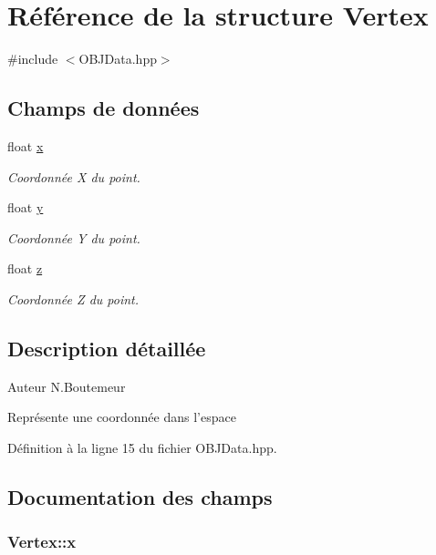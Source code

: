 \hypertarget{structVertex}{\section{Référence de la structure Vertex}
\label{structVertex}
}


{\ttfamily \#include $<$O\+B\+J\+Data.\+hpp$>$}

\subsection*{Champs de données}
\begin{DoxyCompactItemize}
\item 
float \hyperlink{structVertex_aa19a9dc9bd9e7f4cc93053bd082c9d68}{x}
\begin{DoxyCompactList}\small\item\em Coordonnée X du point. \end{DoxyCompactList}\item 
float \hyperlink{structVertex_a094de867ef3e32b21c234cd1ebe42d61}{y}
\begin{DoxyCompactList}\small\item\em Coordonnée Y du point. \end{DoxyCompactList}\item 
float \hyperlink{structVertex_aada56d7a3ea4da97fc44b07b9cdf49b0}{z}
\begin{DoxyCompactList}\small\item\em Coordonnée Z du point. \end{DoxyCompactList}\end{DoxyCompactItemize}


\subsection{Description détaillée}
\begin{DoxyAuthor}{Auteur}
N.\+Boutemeur
\end{DoxyAuthor}
Représente une coordonnée dans l'espace 

Définition à la ligne 15 du fichier O\+B\+J\+Data.\+hpp.



\subsection{Documentation des champs}
\hypertarget{structVertex_aa19a9dc9bd9e7f4cc93053bd082c9d68}{
\subsubsection[{x}]{\setlength{\rightskip}{0pt plus 5cm}Vertex\+::x}}\label{structVertex_aa19a9dc9bd9e7f4cc93053bd082c9d68}


